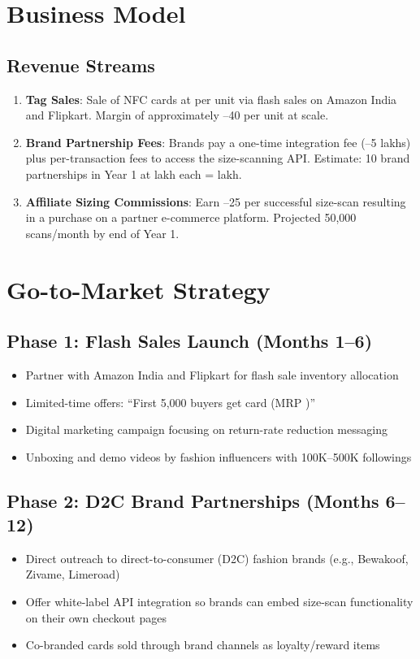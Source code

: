 \documentclass[12pt,a4paper]{article}
\begin{document}
\section{Business Model}

\subsection{Revenue Streams}

\begin{enumerate}
    \item \textbf{Tag Sales}: Sale of NFC cards at  per unit via flash sales on Amazon India and Flipkart. Margin of approximately --40 per unit at scale.
    \item \textbf{Brand Partnership Fees}: Brands pay a one-time integration fee (--5 lakhs) plus per-transaction fees to access the size-scanning API. Estimate: 10 brand partnerships in Year 1 at  lakh each =  lakh.
    \item \textbf{Affiliate Sizing Commissions}: Earn --25 per successful size-scan resulting in a purchase on a partner e-commerce platform. Projected 50,000 scans/month by end of Year 1.
\end{enumerate}

\section{Go-to-Market Strategy}

\subsection{Phase 1: Flash Sales Launch (Months 1--6)}
\begin{itemize}
    \item Partner with Amazon India and Flipkart for flash sale inventory allocation
    \item Limited-time offers: ``First 5,000 buyers get  card (MRP )'' 
    \item Digital marketing campaign focusing on return-rate reduction messaging
    \item Unboxing and demo videos by fashion influencers with 100K--500K followings
\end{itemize}

\subsection{Phase 2: D2C Brand Partnerships (Months 6--12)}
\begin{itemize}
    \item Direct outreach to direct-to-consumer (D2C) fashion brands (e.g., Bewakoof, Zivame, Limeroad)
    \item Offer white-label API integration so brands can embed size-scan functionality on their own checkout pages
    \item Co-branded cards sold through brand channels as loyalty/reward items
\end{itemize}
\end{document}
